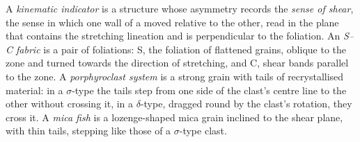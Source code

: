 \begin{definition}\label{def:b3:deformation-mechanisms:kinematic}
A \emph{kinematic indicator} is a structure whose
asymmetry records the \emph{sense of shear}, the sense in
which one wall of a  moved relative to the other, read in the plane
that contains the stretching lineation and is perpendicular to the foliation.
An \emph{S--C fabric} is a pair of foliations: S, the
foliation of flattened grains, oblique to the zone and turned towards the
direction of stretching, and C, shear bands parallel to the zone. A
\emph{porphyroclast system} is a strong grain with
tails of recrystallised material: in a $\sigma$-type the tails step from one
side of the clast's centre line to the other without crossing it, in a
$\delta$-type, dragged round by the clast's rotation, they cross it. A
\emph{mica fish} is a lozenge-shaped mica grain inclined to
the shear plane, with thin tails, stepping like those of a $\sigma$-type clast.
\end{definition}

